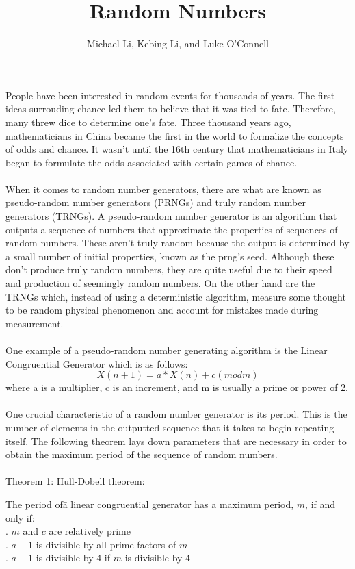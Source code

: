 \documentclass[12pt]{article}
\begin{document}
\title{Random Numbers}
\author{Michael Li, Kebing Li, and Luke O'Connell}
\maketitle
People have been interested in random events for thousands of years. The first ideas surrouding chance led them to believe that it was tied to fate. Therefore, many threw dice to determine one's fate. Three thousand years ago, mathematicians in China became the first in the world to formalize the concepts of odds and chance. It wasn't until the 16th century that mathematicians in Italy began to formulate the odds associated with certain games of chance.\\\\
When it comes to random number generators, there are what are known as pseudo-random number generators (PRNGs) and truly random number generators (TRNGs). A pseudo-random number generator is an algorithm that outputs a sequence of numbers that approximate the properties of sequences of random numbers. These aren't truly random because the output is determined by a small number of initial properties, known as the prng's seed. Although these don't produce truly random numbers, they are quite useful due to their speed and production of seemingly random numbers. On the other hand are the TRNGs which, instead of using a deterministic algorithm, measure some thought to be random physical phenomenon and account for mistakes made during measurement.\\
\\
One example of a pseudo-random number generating algorithm is the Linear Congruential Generator which is as follows:
$$X(n+1)=a*X(n)+c (mod m)$$ where a is a multiplier, c is an increment, and m is usually a prime or power of 2.\\
\\
One crucial characteristic of a random number generator is its period. This is the number of elements in the outputted sequence that it takes to begin repeating itself. The following theorem lays down parameters that are necessary in order to obtain the maximum period of the sequence of random numbers.\\\\
Theorem 1: Hull-Dobell theorem:
\begin{tabbing}
The period of\= a linear congruential generator has a maximum period, $m$, if and only if:\\
. $m$ and $c$ are relatively prime\\
. $a-1$ is divisible by all prime factors of $m$\\
. $a-1$ is divisible by 4 if $m$ is divisible by 4
\end{tabbing}
\end{document}
